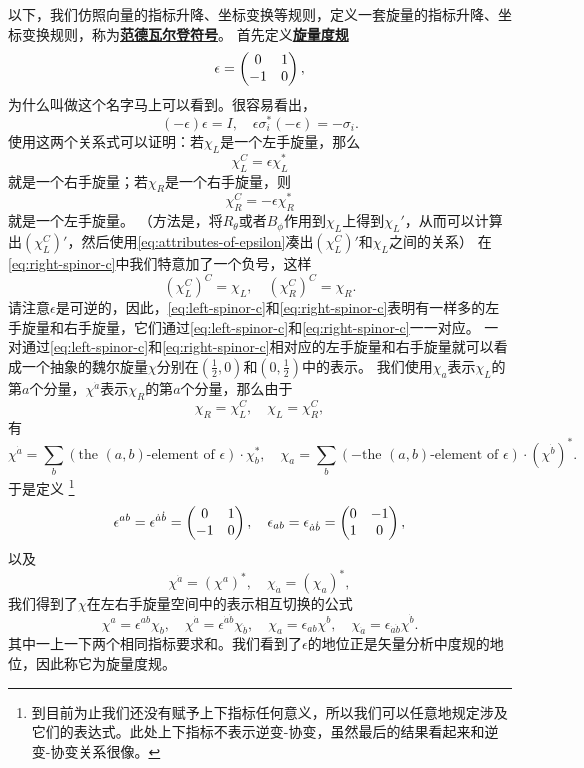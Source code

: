 \documentclass[hyperref, UTF8, a4paper]{ctexart}
\newcommand{\concept}[1]{\underline{\textbf{#1}}}
\begin{document}
以下，我们仿照向量的指标升降、坐标变换等规则，定义一套旋量的指标升降、坐标变换规则，称为\concept{范德瓦尔登符号}。
首先定义\concept{旋量度规}
\begin{equation}
    \epsilon = \pmqty{0 & 1 \\ -1 & 0},
\end{equation}
为什么叫做这个名字马上可以看到。很容易看出，
\begin{equation}
    (-\epsilon) \epsilon = I, \quad \epsilon \sigma_i^* (-\epsilon) = - \sigma_i. 
    \label{eq:attributes-of-epsilon}
\end{equation}
使用这两个关系式可以证明：若$\chi_L$是一个左手旋量，那么
\begin{equation}
    \chi_L^C = \epsilon\chi_L^*
    \label{eq:left-spinor-c}
\end{equation}
就是一个右手旋量；若$\chi_R$是一个右手旋量，则
\begin{equation}
    \chi_R^C = -\epsilon \chi_R^*
    \label{eq:right-spinor-c}
\end{equation}
就是一个左手旋量。
（方法是，将$R_\theta$或者$B_\phi$作用到$\chi_L$上得到$\chi_L'$，从而可以计算出$(\chi_L^C)'$，然后使用\eqref{eq:attributes-of-epsilon}凑出$(\chi_L^C)'$和$\chi_L$之间的关系）
在\eqref{eq:right-spinor-c}中我们特意加了一个负号，这样
\[
    (\chi_L^C)^C = \chi_L, \quad (\chi_R^C)^C = \chi_R.
\]
请注意$\epsilon$是可逆的，因此，\eqref{eq:left-spinor-c}和\eqref{eq:right-spinor-c}表明有一样多的左手旋量和右手旋量，它们通过\eqref{eq:left-spinor-c}和\eqref{eq:right-spinor-c}一一对应。
一对通过\eqref{eq:left-spinor-c}和\eqref{eq:right-spinor-c}相对应的左手旋量和右手旋量就可以看成一个抽象的魏尔旋量$\chi$分别在$(\frac{1}{2},0)$和$(0, \frac{1}{2})$中的表示。
我们使用$\chi_a$表示$\chi_L$的第$a$个分量，$\chi^{\dot{a}}$表示$\chi_R$的第$a$个分量，那么由于
\[
    \chi_R = \chi_L^C, \quad \chi_L = \chi_R^C,
\]
有
\[
    \chi^{\dot{a}} = \sum_b (\text{the $(a,b)$-element of $\epsilon$}) \cdot \chi_b^*, \quad \chi_a = \sum_b ( - \text{the $(a,b)$-element of $\epsilon$}) \cdot (\chi^{\dot{b}})^*.
\]
于是定义%
\footnote{到目前为止我们还没有赋予上下指标任何意义，所以我们可以任意地规定涉及它们的表达式。此处上下指标不表示逆变-协变，虽然最后的结果看起来和逆变-协变关系很像。}
\begin{equation}
    \epsilon^{ab} = \epsilon^{\dot{a} \dot{b}} = \pmqty{0 & 1 \\ -1 & 0}, \quad \epsilon_{ab} = \epsilon_{\dot{a} \dot{b}} = \pmqty{0 & -1 \\ 1 & 0},
\end{equation}
以及
\begin{equation}
    \chi^{\dot{a}} = (\chi^a)^*, \quad \chi_{\dot{a}} = (\chi_a)^*,
\end{equation}
我们得到了$\chi$在左右手旋量空间中的表示相互切换的公式
\begin{equation}
    \chi^a = \epsilon^{ab} \chi_b, \quad \chi^{\dot{a}} = \epsilon^{\dot{a} \dot{b}} \chi_{\dot{b}}, \quad \chi_a = \epsilon_{ab} \chi^b, \quad \chi_{\dot{a}} = \epsilon_{\dot{a} \dot{b}} \chi^{\dot{b}}.
\end{equation}
其中一上一下两个相同指标要求和。我们看到了$\epsilon$的地位正是矢量分析中度规的地位，因此称它为旋量度规。
\end{document}
